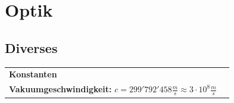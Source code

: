 \section{Optik}

\subsection{Diverses}
\begin{tabular}{p{10cm}p{6cm}}
   \textbf{Konstanten} \\
   \textbf{Vakuumgeschwindigkeit:} \newline 
  $c=299'792'458 \frac{m}{s} \approx 3 \cdot 10^8 \frac{m}{s}$ \\
\end{tabular}

